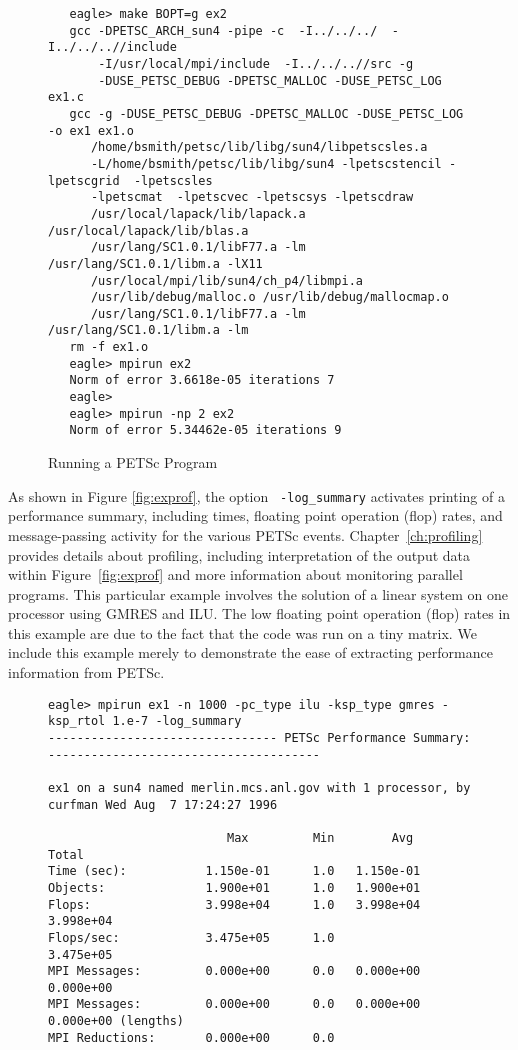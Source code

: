 {\begin{figure}[H]
{\small
\begin{verbatim}
   eagle> make BOPT=g ex2
   gcc -DPETSC_ARCH_sun4 -pipe -c  -I../../../  -I../../..//include   
       -I/usr/local/mpi/include  -I../../..//src -g 
       -DUSE_PETSC_DEBUG -DPETSC_MALLOC -DUSE_PETSC_LOG ex1.c
   gcc -g -DUSE_PETSC_DEBUG -DPETSC_MALLOC -DUSE_PETSC_LOG -o ex1 ex1.o 
      /home/bsmith/petsc/lib/libg/sun4/libpetscsles.a 
      -L/home/bsmith/petsc/lib/libg/sun4 -lpetscstencil -lpetscgrid  -lpetscsles 
      -lpetscmat  -lpetscvec -lpetscsys -lpetscdraw  
      /usr/local/lapack/lib/lapack.a /usr/local/lapack/lib/blas.a 
      /usr/lang/SC1.0.1/libF77.a -lm /usr/lang/SC1.0.1/libm.a -lX11 
      /usr/local/mpi/lib/sun4/ch_p4/libmpi.a
      /usr/lib/debug/malloc.o /usr/lib/debug/mallocmap.o  
      /usr/lang/SC1.0.1/libF77.a -lm /usr/lang/SC1.0.1/libm.a -lm
   rm -f ex1.o
   eagle> mpirun ex2
   Norm of error 3.6618e-05 iterations 7
   eagle>
   eagle> mpirun -np 2 ex2
   Norm of error 5.34462e-05 iterations 9
\end{verbatim}
}
\nobreak
\caption{Running a PETSc Program}
\label{fig:exrun}
\end{figure}

As shown in Figure \ref{fig:exprof}, the option {\tt
-log\_summary} activates printing of a performance summary, including
times, floating point operation (flop) rates, and message-passing
activity for the various PETSc events.  Chapter~\ref{ch:profiling}
provides details about profiling, including interpretation of the
output data within Figure~\ref{fig:exprof}
and more information about monitoring parallel
programs. This particular example involves the solution of a linear
system on one processor using GMRES and ILU.  The low floating point
operation (flop) rates in this example are due to the fact that the
code was run on a tiny matrix.  We include this example merely to
demonstrate the ease of extracting performance information from PETSc.

\begin{figure}[H]
{\footnotesize
\begin{verbatim}
eagle> mpirun ex1 -n 1000 -pc_type ilu -ksp_type gmres -ksp_rtol 1.e-7 -log_summary
-------------------------------- PETSc Performance Summary: --------------------------------------

ex1 on a sun4 named merlin.mcs.anl.gov with 1 processor, by curfman Wed Aug  7 17:24:27 1996

                         Max         Min        Avg        Total 
Time (sec):           1.150e-01      1.0   1.150e-01
Objects:              1.900e+01      1.0   1.900e+01
Flops:                3.998e+04      1.0   3.998e+04  3.998e+04
Flops/sec:            3.475e+05      1.0              3.475e+05
MPI Messages:         0.000e+00      0.0   0.000e+00  0.000e+00
MPI Messages:         0.000e+00      0.0   0.000e+00  0.000e+00 (lengths)
MPI Reductions:       0.000e+00      0.0


\end{verbatim}}
\end{figure}}
